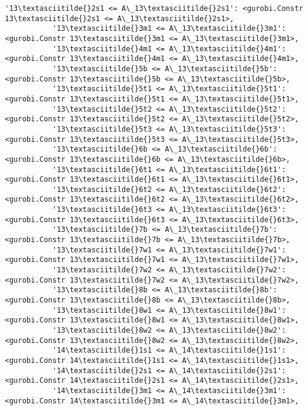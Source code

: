 \documentclass[11pt]{article}
\begin{document}
\begin{Verbatim}[commandchars=\\\{\}]
           '13\textasciitilde{}2s1 <= A\_13\textasciitilde{}2s1': <gurobi.Constr 13\textasciitilde{}2s1 <= A\_13\textasciitilde{}2s1>,
           '13\textasciitilde{}3m1 <= A\_13\textasciitilde{}3m1': <gurobi.Constr 13\textasciitilde{}3m1 <= A\_13\textasciitilde{}3m1>,
           '13\textasciitilde{}4m1 <= A\_13\textasciitilde{}4m1': <gurobi.Constr 13\textasciitilde{}4m1 <= A\_13\textasciitilde{}4m1>,
           '13\textasciitilde{}5b <= A\_13\textasciitilde{}5b': <gurobi.Constr 13\textasciitilde{}5b <= A\_13\textasciitilde{}5b>,
           '13\textasciitilde{}5t1 <= A\_13\textasciitilde{}5t1': <gurobi.Constr 13\textasciitilde{}5t1 <= A\_13\textasciitilde{}5t1>,
           '13\textasciitilde{}5t2 <= A\_13\textasciitilde{}5t2': <gurobi.Constr 13\textasciitilde{}5t2 <= A\_13\textasciitilde{}5t2>,
           '13\textasciitilde{}5t3 <= A\_13\textasciitilde{}5t3': <gurobi.Constr 13\textasciitilde{}5t3 <= A\_13\textasciitilde{}5t3>,
           '13\textasciitilde{}6b <= A\_13\textasciitilde{}6b': <gurobi.Constr 13\textasciitilde{}6b <= A\_13\textasciitilde{}6b>,
           '13\textasciitilde{}6t1 <= A\_13\textasciitilde{}6t1': <gurobi.Constr 13\textasciitilde{}6t1 <= A\_13\textasciitilde{}6t1>,
           '13\textasciitilde{}6t2 <= A\_13\textasciitilde{}6t2': <gurobi.Constr 13\textasciitilde{}6t2 <= A\_13\textasciitilde{}6t2>,
           '13\textasciitilde{}6t3 <= A\_13\textasciitilde{}6t3': <gurobi.Constr 13\textasciitilde{}6t3 <= A\_13\textasciitilde{}6t3>,
           '13\textasciitilde{}7b <= A\_13\textasciitilde{}7b': <gurobi.Constr 13\textasciitilde{}7b <= A\_13\textasciitilde{}7b>,
           '13\textasciitilde{}7w1 <= A\_13\textasciitilde{}7w1': <gurobi.Constr 13\textasciitilde{}7w1 <= A\_13\textasciitilde{}7w1>,
           '13\textasciitilde{}7w2 <= A\_13\textasciitilde{}7w2': <gurobi.Constr 13\textasciitilde{}7w2 <= A\_13\textasciitilde{}7w2>,
           '13\textasciitilde{}8b <= A\_13\textasciitilde{}8b': <gurobi.Constr 13\textasciitilde{}8b <= A\_13\textasciitilde{}8b>,
           '13\textasciitilde{}8w1 <= A\_13\textasciitilde{}8w1': <gurobi.Constr 13\textasciitilde{}8w1 <= A\_13\textasciitilde{}8w1>,
           '13\textasciitilde{}8w2 <= A\_13\textasciitilde{}8w2': <gurobi.Constr 13\textasciitilde{}8w2 <= A\_13\textasciitilde{}8w2>,
           '14\textasciitilde{}1s1 <= A\_14\textasciitilde{}1s1': <gurobi.Constr 14\textasciitilde{}1s1 <= A\_14\textasciitilde{}1s1>,
           '14\textasciitilde{}2s1 <= A\_14\textasciitilde{}2s1': <gurobi.Constr 14\textasciitilde{}2s1 <= A\_14\textasciitilde{}2s1>,
           '14\textasciitilde{}3m1 <= A\_14\textasciitilde{}3m1': <gurobi.Constr 14\textasciitilde{}3m1 <= A\_14\textasciitilde{}3m1>,

\end{Verbatim}
\end{document}
